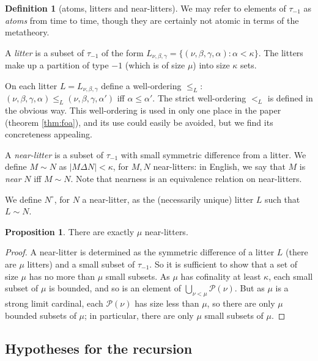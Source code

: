 \documentclass[112pt]{article}
\theoremstyle{definition}
\newtheorem{proposition}[theorem]{Proposition}
\newtheorem{definition}[theorem]{Definition}
\theoremstyle{remark}
\begin{document}
\begin{definition}[atoms, litters and near-litters]\label{def:atom_litter_near_litter}
We may refer to elements of $\tau_{-1}$ as {\em atoms\/} from time to time, though they are certainly not atomic in terms of the metatheory.

A {\em litter\/} is a subset of $\tau_{-1}$ of the form $L_{\nu,\beta,\gamma} = \{(\nu,\beta,\gamma,\alpha):\alpha<\kappa\}$.  The litters make up a partition of type $-1$
(which is of size $\mu$) into size $\kappa$ sets.

On each litter $L =  L_{\nu,\beta,\gamma}$ define a well-ordering $\leq_L$:  $(\nu,\beta,\gamma,\alpha) \leq_L (\nu,\beta,\gamma,\alpha')$  iff $\alpha\leq \alpha'$.
The strict well-ordering $<_L$ is defined in the obvious way.  This well-ordering is used in only one place in the paper (theorem \ref{thm:foa}), and its use could easily be avoided, but we find its concreteness appealing.

A {\em near-litter\/} is a subset of $\tau_{-1}$ with small symmetric difference from a litter.  We define $M \sim N$ as $|M \Delta N|<\kappa$, for $M,N$ near-litters:  in English, we say that $M$ is {\em near\/} $N$ iff $M \sim N$.  Note that nearness is an equivalence relation on near-litters.

We define $N^\circ$, for $N$ a near-litter, as the (necessarily unique) litter $L$ such that $L \sim N$.
\end{definition}

\begin{proposition}\label{def:count_near_litters}
There are exactly $\mu$ near-litters.

\end{proposition}

\begin{proof}
A near-litter is determined as the symmetric difference of a litter $L$ (there are $\mu$ litters) and a small subset of
$\tau_{-1}$.
So it is sufficient to show that a set of size $\mu$ has no more than $\mu$ small subsets.
As $\mu$ has cofinality at least $\kappa$, each small subset of $\mu$ is bounded, and so is an element of $\bigcup_{\nu < \mu} \mathcal P(\nu)$.
But as $\mu$ is a strong limit cardinal, each $\mathcal P(\nu)$ has size less than $\mu$, so there are only $\mu$ bounded subsets of $\mu$; in particular, there are only $\mu$ small subsets of $\mu$.
\end{proof}

\subsection{Hypotheses for the recursion}\label{ss:hypotheses}
\end{document}
